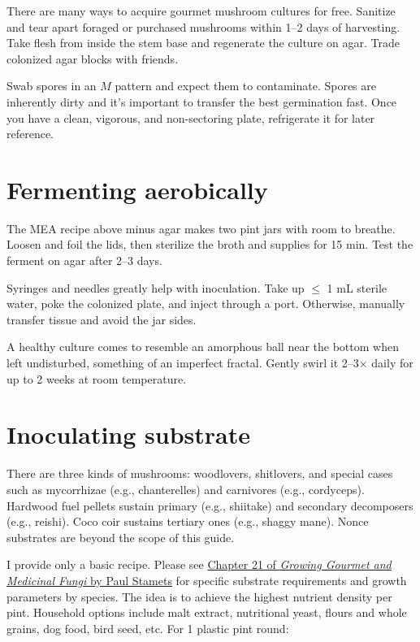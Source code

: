 \documentclass{article}
\begin{document}
There are many ways to acquire gourmet mushroom cultures for free.
Sanitize and tear apart foraged or purchased mushrooms within 1--2 days of harvesting.
Take flesh from inside the stem base and regenerate the culture on agar.
Trade colonized agar blocks with friends.

Swab spores in an $M$ pattern and expect them to contaminate.
Spores are inherently dirty and it's important to transfer the best germination fast.
Once you have a clean, vigorous, and non-sectoring plate, refrigerate it for later reference.


\section*{Fermenting aerobically}

The MEA recipe above minus agar makes two pint jars with room to breathe.
Loosen and foil the lids, then sterilize the broth and supplies for 15 min.
Test the ferment on agar after 2--3 days.

Syringes and needles greatly help with inoculation.
Take up $\leq$ 1 mL sterile water, poke the colonized plate, and inject through a port.
Otherwise, manually transfer tissue and avoid the jar sides.

A healthy culture comes to resemble an amorphous ball near the bottom when left undisturbed, something of an imperfect fractal.
Gently swirl it 2--3$\times$ daily for up to 2 weeks at room temperature. 


\section*{Inoculating substrate}

There are three kinds of mushrooms: woodlovers, shitlovers, and special cases such as mycorrhizae (e.g., chanterelles) and carnivores (e.g., cordyceps).
Hardwood fuel pellets sustain primary (e.g., shiitake) and secondary decomposers (e.g., reishi).
Coco coir sustains tertiary ones (e.g., shaggy mane).
Nonce substrates are beyond the scope of this guide.

I provide only a basic recipe.
Please see \href{http://library.uniteddiversity.coop/Permaculture/Growing_Gourmet_and_Medicinal_Mushrooms.pdf}{Chapter 21 of \emph{Growing Gourmet and Medicinal Fungi} by Paul Stamets} for specific substrate requirements and growth parameters by species.
The idea is to achieve the highest nutrient density per pint.
Household options include malt extract, nutritional yeast, flours and whole grains, dog food, bird seed, etc.
For 1 plastic pint round:
\end{document}
